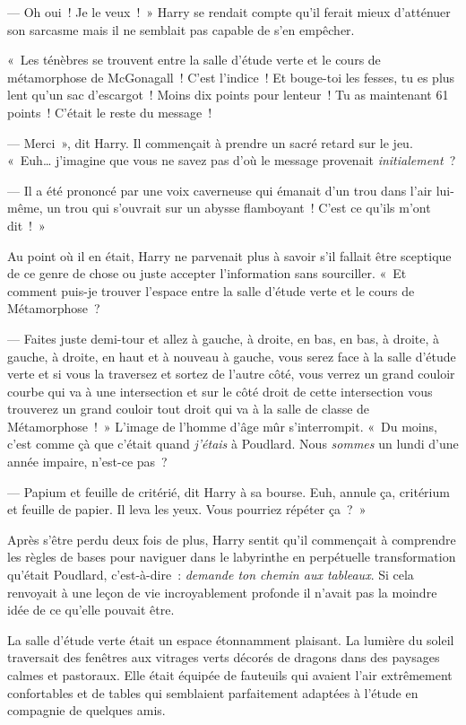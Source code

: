 --- Oh oui~! Je le veux~!~» Harry se rendait compte qu'il ferait mieux d'atténuer son sarcasme mais il ne semblait pas capable de s'en empêcher.

«~Les ténèbres se trouvent entre la salle d'étude verte et le cours de métamorphose de McGonagall~!
C'est l'indice~! Et bouge-toi les fesses, tu es plus lent qu'un sac d'escargot~!
Moins dix points pour lenteur~!
Tu as maintenant 61 points~!
C'était le reste du message~!

--- Merci~», dit Harry. Il commençait à prendre un sacré retard sur le jeu.
«~Euh… j'imagine que vous ne savez pas d'où le message provenait \emph{initialement}~?

--- Il a été prononcé par une voix caverneuse qui émanait d'un trou dans l'air lui-même, un trou qui s'ouvrait sur un abysse flamboyant~! C'est ce qu'ils m'ont dit~!~»

Au point où il en était, Harry ne parvenait plus à savoir s'il fallait être sceptique de ce genre de chose ou juste accepter l'information sans sourciller.
«~Et comment puis-je trouver l'espace entre la salle d'étude verte et le cours de Métamorphose~?

--- Faites juste demi-tour et allez à gauche, à droite, en bas, en bas, à droite, à gauche, à droite, en haut et à nouveau à gauche, vous serez face à la salle d'étude verte et si vous la traversez et sortez de l'autre côté, vous verrez un grand couloir courbe qui va à une intersection et sur le côté droit de cette intersection vous trouverez un grand couloir tout droit qui va à la salle de classe de Métamorphose~!~»
L'image de l'homme d'âge mûr s'interrompit.
«~Du moins, c'est comme çà que c'était quand \emph{j'étais} à Poudlard.
Nous \emph{sommes} un lundi d'une année impaire, n'est-ce pas~?

--- Papium et feuille de critérié, dit Harry à sa bourse. Euh, annule ça, critérium et feuille de papier. Il leva les yeux. Vous pourriez répéter ça~?~»

Après s'être perdu deux fois de plus, Harry sentit qu'il commençait à comprendre les règles de bases pour naviguer dans le labyrinthe en perpétuelle transformation qu'était Poudlard, c'est-à-dire~: \emph{demande ton chemin aux tableaux}.
Si cela renvoyait à une leçon de vie incroyablement profonde il n'avait pas la moindre idée de ce qu'elle pouvait être.

La salle d'étude verte était un espace étonnamment plaisant.
La lumière du soleil traversait des fenêtres aux vitrages verts décorés de dragons dans des paysages calmes et pastoraux.
Elle était équipée de fauteuils qui avaient l'air extrêmement confortables et de tables qui semblaient parfaitement adaptées à l'étude en compagnie de quelques amis.

